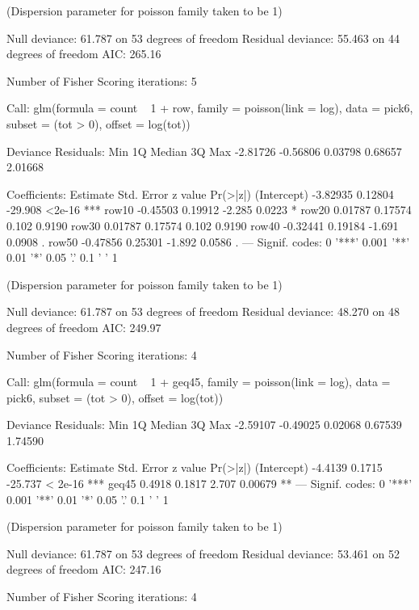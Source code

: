 \documentclass{article}
\begin{document}
\begin{Schunk}
\begin{Soutput}
(Dispersion parameter for poisson family taken to be 1)

    Null deviance: 61.787  on 53  degrees of freedom
Residual deviance: 55.463  on 44  degrees of freedom
AIC: 265.16

Number of Fisher Scoring iterations: 5
\end{Soutput}
\begin{Soutput}
Call:
glm(formula = count ~ 1 + row, family = poisson(link = log), 
    data = pick6, subset = (tot > 0), offset = log(tot))

Deviance Residuals: 
     Min        1Q    Median        3Q       Max  
-2.81726  -0.56806   0.03798   0.68657   2.01668  

Coefficients:
            Estimate Std. Error z value Pr(>|z|)    
(Intercept) -3.82935    0.12804 -29.908   <2e-16 ***
row10       -0.45503    0.19912  -2.285   0.0223 *  
row20        0.01787    0.17574   0.102   0.9190    
row30        0.01787    0.17574   0.102   0.9190    
row40       -0.32441    0.19184  -1.691   0.0908 .  
row50       -0.47856    0.25301  -1.892   0.0586 .  
---
Signif. codes:  0 '***' 0.001 '**' 0.01 '*' 0.05 '.' 0.1 ' ' 1

(Dispersion parameter for poisson family taken to be 1)

    Null deviance: 61.787  on 53  degrees of freedom
Residual deviance: 48.270  on 48  degrees of freedom
AIC: 249.97

Number of Fisher Scoring iterations: 4
\end{Soutput}
\begin{Soutput}
Call:
glm(formula = count ~ 1 + geq45, family = poisson(link = log), 
    data = pick6, subset = (tot > 0), offset = log(tot))

Deviance Residuals: 
     Min        1Q    Median        3Q       Max  
-2.59107  -0.49025   0.02068   0.67539   1.74590  

Coefficients:
            Estimate Std. Error z value Pr(>|z|)    
(Intercept)  -4.4139     0.1715 -25.737  < 2e-16 ***
geq45         0.4918     0.1817   2.707  0.00679 ** 
---
Signif. codes:  0 '***' 0.001 '**' 0.01 '*' 0.05 '.' 0.1 ' ' 1

(Dispersion parameter for poisson family taken to be 1)

    Null deviance: 61.787  on 53  degrees of freedom
Residual deviance: 53.461  on 52  degrees of freedom
AIC: 247.16

Number of Fisher Scoring iterations: 4
\end{Soutput}
\end{Schunk}
\end{document}
